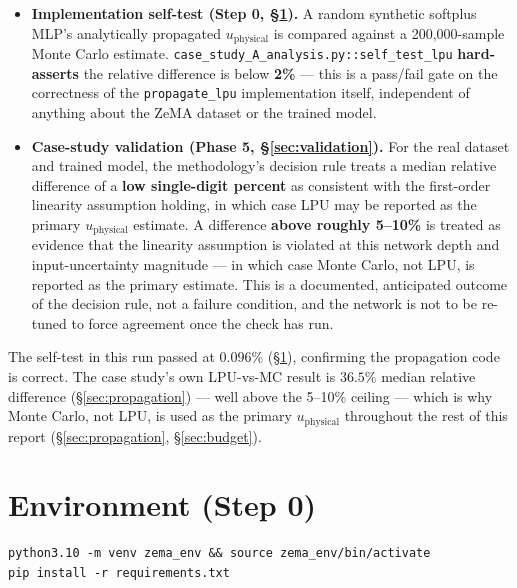 \documentclass[11pt]{article}
\begin{document}
\begin{itemize}
\item \textbf{Implementation self-test (Step 0, \S\ref{sec:environment}).} A
random synthetic softplus MLP's analytically propagated $u_{\mathrm{physical}}$ is compared
against a 200{,}000-sample Monte Carlo estimate.
\texttt{case\allowbreak\_study\allowbreak\_A\allowbreak\_analysis.py::self\allowbreak\_test\allowbreak\_lpu} \textbf{hard-asserts}
the relative difference is below \textbf{2\%} --- this is a pass/fail gate
on the correctness of the \texttt{propagate\_lpu} implementation itself,
independent of anything about the ZeMA dataset or the trained model.
\item \textbf{Case-study validation (Phase 5, \S\ref{sec:validation}).} For
the real dataset and trained model, the methodology's decision rule treats a
median relative difference of a \textbf{low single-digit percent} as
consistent with the first-order linearity assumption holding, in which case
LPU may be reported as the primary $u_{\mathrm{physical}}$ estimate. A difference \textbf{above
roughly 5--10\%} is treated as evidence that the linearity assumption is
violated at this network depth and input-uncertainty magnitude --- in which
case Monte Carlo, not LPU, is reported as the primary estimate. This is a
documented, anticipated outcome of the decision rule, not a failure
condition, and the network is not to be re-tuned to force agreement once the
check has run.
\end{itemize}

The self-test in this run passed at $0.096\%$ (\S\ref{sec:environment}),
confirming the propagation code is correct. The case study's own LPU-vs-MC
result is $36.5\%$ median relative difference (\S\ref{sec:propagation}) ---
well above the 5--10\% ceiling --- which is why Monte Carlo, not LPU, is
used as the primary $u_{\mathrm{physical}}$ throughout the rest of this report
(\S\ref{sec:propagation}, \S\ref{sec:budget}).

\section{Environment (Step 0)}
\label{sec:environment}

\begin{verbatim}
python3.10 -m venv zema_env && source zema_env/bin/activate
pip install -r requirements.txt
\end{verbatim}
\end{document}
